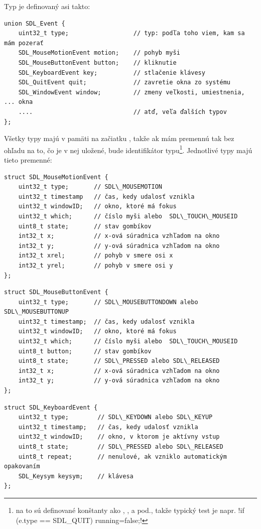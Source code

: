  
Typ  je definovaný asi takto:

\begin{lstlisting}
union SDL_Event {
    uint32_t type;                  // typ: podľa toho viem, kam sa mám pozerať
    SDL_MouseMotionEvent motion;    // pohyb myši
    SDL_MouseButtonEvent button;    // kliknutie
    SDL_KeyboardEvent key;          // stlačenie klávesy
    SDL_QuitEvent quit;             // zavretie okna zo systému
    SDL_WindowEvent window;         // zmeny veľkosti, umiestnenia, ... okna
    ....                            // atď, veľa ďalších typov
};
\end{lstlisting}

Všetky typy majú v pamäti na začiatku , takže ak mám premennú  tak bez ohľadu na to, čo je v nej uložené, 
 bude identifikátor typu\footnote{na to sú definované konštanty ako , ,  a pod., takže typický test je napr.
\prg!if (e.type == SDL_QUIT) running=false;!}. Jednotlivé typy majú tieto premenné:

\begin{lstlisting}
struct SDL_MouseMotionEvent {
    uint32_t type;       // SDL\_MOUSEMOTION 
    uint32_t timestamp   // čas, kedy udalosť vznikla
    uint32_t windowID;   // okno, ktoré má fokus
    uint32_t which;      // číslo myši alebo  SDL\_TOUCH\_MOUSEID  
    uint8_t state;       // stav gombíkov
    int32_t x;           // x-ová súradnica vzhľadom na okno
    int32_t y;           // y-ová súradnica vzhľadom na okno
    int32_t xrel;        // pohyb v smere osi x
    int32_t yrel;        // pohyb v smere osi y
};
\end{lstlisting}

\begin{lstlisting}
struct SDL_MouseButtonEvent {
    uint32_t type;       // SDL\_MOUSEBUTTONDOWN alebo SDL\_MOUSEBUTTONUP 
    uint32_t timestamp;  // čas, kedy udalosť vznikla
    uint32_t windowID;   // okno, ktoré má fokus
    uint32_t which;      // číslo myši alebo  SDL\_TOUCH\_MOUSEID
    uint8_t button;      // stav gombíkov
    uint8_t state;       // SDL\_PRESSED alebo SDL\_RELEASED 
    int32_t x;           // x-ová súradnica vzhľadom na okno
    int32_t y;           // y-ová súradnica vzhľadom na okno
};
\end{lstlisting}

\begin{lstlisting}
struct SDL_KeyboardEvent {
    uint32_t type;        // SDL\_KEYDOWN alebo SDL\_KEYUP 
    uint32_t timestamp;   // čas, kedy udalosť vznikla
    uint32_t windowID;    // okno, v ktorom je aktívny vstup
    uint8_t state;        // SDL\_PRESSED alebo SDL\_RELEASED
    uint8_t repeat;       // nenulové, ak vzniklo automatickým opakovaním
    SDL_Keysym keysym;    // klávesa
};
\end{lstlisting}

